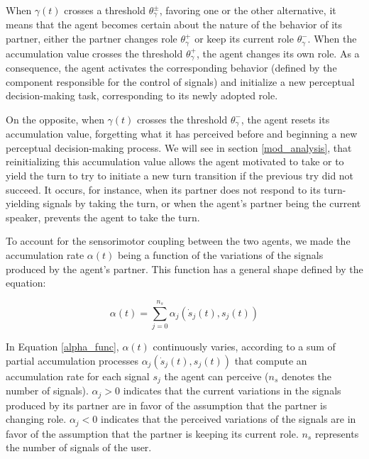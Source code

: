 When $\gamma(t)$ crosses a threshold $\theta_{\gamma}^{\pm}$, favoring one or the other alternative, it means that the agent becomes certain about the nature of the behavior of its partner, either the partner changes role $\theta_{\gamma}^{+}$ or keep its current role $\theta_{\gamma}^{-}$. When the accumulation value crosses the threshold $\theta_{\gamma}^{+}$, the agent changes its own role. As a consequence, the agent activates the corresponding behavior (defined by the component responsible for the control of signals) and initialize a new perceptual decision-making task, corresponding to its newly adopted role.

On the opposite, when $\gamma(t)$ crosses the threshold $\theta_{\gamma}^{-}$, the agent resets its accumulation value, forgetting what it has perceived before and beginning a new perceptual decision-making process. 
We will see in section \ref{mod_analysis}, that reinitializing this accumulation value allows the agent motivated to take or to yield the turn to try to initiate a new turn transition if the previous try did not succeed. 
It occurs, for instance, when its partner does not respond to its turn-yielding signals by taking the turn, or when the agent's partner being the current speaker, prevents the agent to take the turn.

To account for the sensorimotor coupling between the two agents, we made the accumulation rate $\alpha(t)$ being a function of the variations of the signals produced by the agent's partner. This function has a general shape defined by the equation: 

\begin{equation}
  \alpha(t) = \sum_{j=0}^{n_{s}} \alpha_{j}(\dot{s}_j(t),s_j(t))
  \label{alpha_func}
\end{equation}

In Equation \ref{alpha_func}, $\alpha(t)$ continuously varies, according to a sum of partial accumulation processes $\alpha_{j}(\dot{s}_{j}(t),s_{j}(t))$ that compute an accumulation rate for each signal $s_j$ the agent can perceive ($n_s$ denotes the number of signals). %
$\alpha_{j}>0$ indicates that the current variations in the signals produced by its partner are in favor of the assumption that the partner is changing role.
 $\alpha_{j}<0$  indicates that the perceived variations of the signals are in favor of the assumption that the partner is keeping its current role. $n_{s}$ represents the number of signals of the user. 

